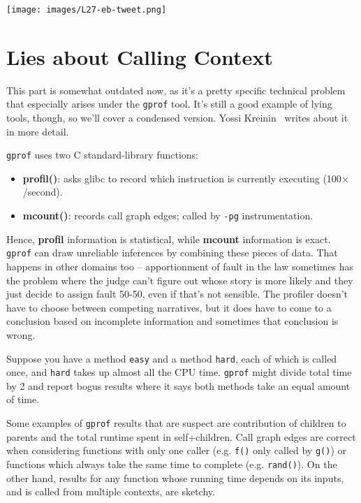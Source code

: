 \begin{center}
\texttt{[image: images/L27-eb-tweet.png]}
\end{center}

\section*{Lies about Calling Context}
This part is somewhat outdated now, as it's a pretty specific technical problem that especially arises under the {\tt gprof} tool. It's still a good example of lying tools, though, so we'll cover a condensed version. Yossi Kreinin~\cite{lies} writes about it in more detail.

\texttt{gprof} uses two C standard-library functions:
\vspace{-1em}
\begin{itemize}[noitemsep]
\item {\bf profil()}: asks glibc to record which instruction 
  is currently executing (100$\times$/second).
\item {\bf mcount()}: records call graph edges; called by {\tt -pg} instrumentation.
\end{itemize}
\vspace*{-1em}

Hence, {\bf profil} information is statistical, while {\bf mcount}
information is exact.  \texttt{gprof} can draw unreliable inferences by combining these pieces of data. That happens in other domains too -- apportionment of fault in the law sometimes has the problem where the judge can't figure out whose story is more likely and they just decide to assign fault 50-50, even if that's not sensible. The profiler doesn't have to choose between competing narratives, but it does have to come to a conclusion based on incomplete information and sometimes that conclusion is wrong.

Suppose you have a method \texttt{easy} and a method \texttt{hard}, each of which is called once, and \texttt{hard} takes up almost all the CPU time. \texttt{gprof} might divide total time by 2 and report bogus results where it says both methods take an equal amount of time.

Some examples of \texttt{gprof} results that are suspect are contribution of children to parents and the total runtime spent in self+children. Call graph edges are correct when considering functions with only one caller (e.g. {\tt f()} only called by {\tt g()}) or functions which always take the same time to complete (e.g. {\tt rand()}). On the other hand, results for any function whose running time depends on its inputs, and is called from multiple contexts, are sketchy.

